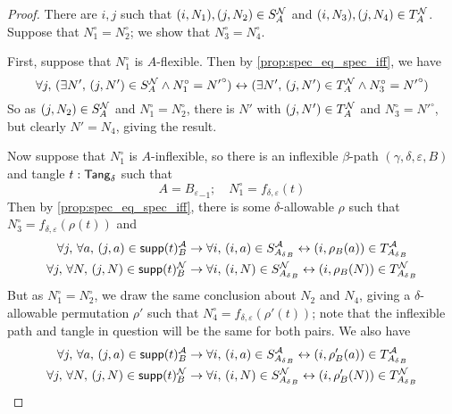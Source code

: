 \begin{proof}
  There are \( i, j \) such that \( (i, N_1), (j, N_2) \in S_A^{\mathcal N} \) and \( (i, N_3), (j, N_4) \in T_A^{\mathcal N} \).
  Suppose that \( N_1^\circ = N_2^\circ \); we show that \( N_3^\circ = N_4^\circ \).

  First, suppose that \( N_1^\circ \) is \( A \)-flexible.
  Then by \cref{prop:spec_eq_spec_iff}, we have
  \[ \forall j,\, (\exists N',\, (j, N') \in S_A^{\mathcal N} \wedge N_1^\circ = {N'}^\circ) \leftrightarrow (\exists N',\, (j, N') \in T_A^{\mathcal N} \wedge N_3^\circ = {N'}^\circ) \]
  So as \( (j, N_2) \in S_A^{\mathcal N} \) and \( N_1^\circ = N_2^\circ \), there is \( N' \) with \( (j, N') \in T_A^{\mathcal N} \) and \( N_3^\circ = {N'}^\circ \), but clearly \( N' = N_4 \), giving the result.

  Now suppose that \( N_1^\circ \) is \( A \)-inflexible, so there is an inflexible \( \beta \)-path \( (\gamma,\delta,\varepsilon,B) \) and tangle \( t : \mathsf{Tang}_\delta \) such that
  \[ A = {B_\varepsilon}_{-1};\quad N_1^\circ = f_{\delta,\varepsilon}(t) \]
  Then by \cref{prop:spec_eq_spec_iff}, there is some \( \delta \)-allowable \( \rho \) such that \( N_3^\circ = f_{\delta,\varepsilon}(\rho(t)) \) and
  \begin{align*}
    \forall j,\, \forall a,\, (j, a) \in \operatorname{\mathsf{supp}}(t)_B^{\mathcal A} &\to \forall i,\, (i, a) \in S_{{A_\delta}_B}^{\mathcal A} \leftrightarrow (i, \rho_B(a)) \in T_{{A_\delta}_B}^{\mathcal A} \\
    \forall j,\, \forall N,\, (j, N) \in \operatorname{\mathsf{supp}}(t)_B^{\mathcal N} &\to \forall i,\, (i, N) \in S_{{A_\delta}_B}^{\mathcal N} \leftrightarrow (i, \rho_B(N)) \in T_{{A_\delta}_B}^{\mathcal N}
  \end{align*}
  But as \( N_1^\circ = N_2^\circ \), we draw the same conclusion about \( N_2 \) and \( N_4 \), giving a \( \delta \)-allowable permutation \( \rho' \) such that \( N_4^\circ = f_{\delta,\varepsilon}(\rho'(t)) \); note that the inflexible path and tangle in question will be the same for both pairs.
  We also have
  \begin{align*}
    \forall j,\, \forall a,\, (j, a) \in \operatorname{\mathsf{supp}}(t)_B^{\mathcal A} &\to \forall i,\, (i, a) \in S_{{A_\delta}_B}^{\mathcal A} \leftrightarrow (i, \rho'_B(a)) \in T_{{A_\delta}_B}^{\mathcal A} \\
    \forall j,\, \forall N,\, (j, N) \in \operatorname{\mathsf{supp}}(t)_B^{\mathcal N} &\to \forall i,\, (i, N) \in S_{{A_\delta}_B}^{\mathcal N} \leftrightarrow (i, \rho'_B(N)) \in T_{{A_\delta}_B}^{\mathcal N}
  \end{align*}

\end{proof}
